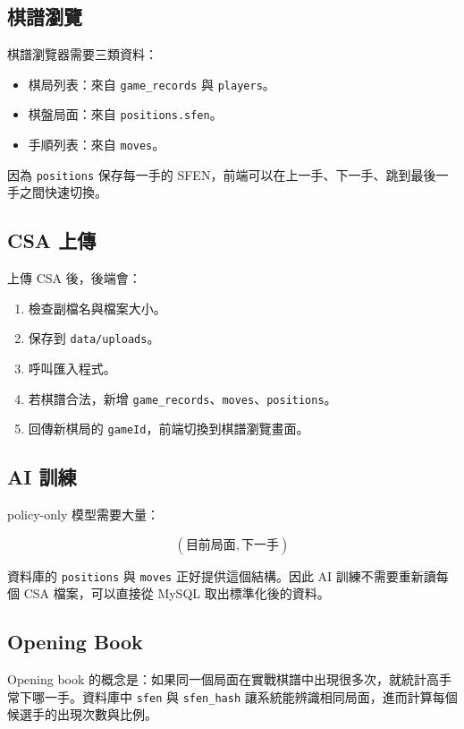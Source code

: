 \documentclass[12pt,a4paper,fontset=none]{ctexart}
\begin{document}
\subsection{棋譜瀏覽}

棋譜瀏覽器需要三類資料：

\begin{itemize}
  \item 棋局列表：來自 \texttt{game\_records} 與 \texttt{players}。
  \item 棋盤局面：來自 \texttt{positions.sfen}。
  \item 手順列表：來自 \texttt{moves}。
\end{itemize}

因為 \texttt{positions} 保存每一手的 SFEN，前端可以在上一手、下一手、跳到最後一手之間快速切換。

\subsection{CSA 上傳}

上傳 CSA 後，後端會：

\begin{enumerate}
  \item 檢查副檔名與檔案大小。
  \item 保存到 \texttt{data/uploads}。
  \item 呼叫匯入程式。
  \item 若棋譜合法，新增 \texttt{game\_records}、\texttt{moves}、\texttt{positions}。
  \item 回傳新棋局的 \texttt{gameId}，前端切換到棋譜瀏覽畫面。
\end{enumerate}

\subsection{AI 訓練}

policy-only 模型需要大量：

\[
(\text{目前局面}, \text{下一手})
\]

資料庫的 \texttt{positions} 與 \texttt{moves} 正好提供這個結構。因此 AI 訓練不需要重新讀每個 CSA 檔案，可以直接從 MySQL 取出標準化後的資料。

\subsection{Opening Book}

Opening book 的概念是：如果同一個局面在實戰棋譜中出現很多次，就統計高手常下哪一手。資料庫中 \texttt{sfen} 與 \texttt{sfen\_hash} 讓系統能辨識相同局面，進而計算每個候選手的出現次數與比例。
\end{document}
